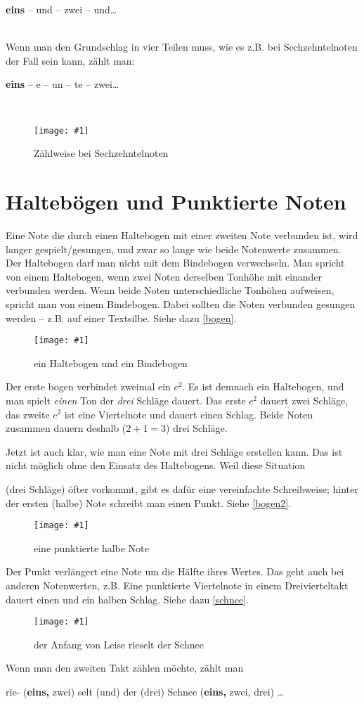 \documentclass[10pt,a4paper,twoside]{report}
\newcommand{\comment}[1]{
	\marginpar{
		\textsf{#1}
	}
}
\newcommand{\image}[4]{
	\begin{figure}[!ht]
		\centering
		\texttt{[image: \#1]}
		\caption{#2}
		\label{#3}
	\end{figure}
}
\newcommand{\myquote}[1]{
	\hspace{15mm}
	\parbox{100mm}{
		#1
	}
	\ \\
}
\begin{document}
\myquote{\textbf{eins} -- und -- zwei -- und\dots}

Wenn man den Grundschlag in vier Teilen muss, wie es z.B. bei Sechzehntelnoten der
Fall sein kann, zählt man: 

\myquote{\textbf{eins} -- e -- un -- te -- zwei\dots}

\image{lilypond/sechzehn.png}{Zählweise bei Sechzehntelnoten}{sechzehn}{7}

\section{Haltebögen und Punktierte Noten}
Eine Note die durch einen Haltebogen mit einer zweiten Note verbunden ist,
wird langer gespielt/gesungen, und zwar so lange wie beide Notenwerte zusammen.
Der Haltebogen\comment{Haltebogen} darf man nicht mit dem Bindebogen verwechseln.
Man spricht von einem Haltebogen, wenn zwei Noten derselben Tonhöhe mit einander
verbunden werden. Wenn beide Noten unterschiedliche Tonhöhen aufweisen, spricht man
von einem Bindebogen. Dabei sollten die Noten verbunden gesungen werden -- 
z.B. auf einer Textsilbe. Siehe dazu \autoref{bogen}.
\image{lilypond/bogen.png}{ein Haltebogen und ein Bindebogen}{bogen}{6}

Der erste bogen verbindet zweimal ein $c^2$. Es ist demnach ein Haltebogen, und man
spielt \emph{einen} Ton der \emph{drei} Schläge dauert. Das erste $c^2$ dauert zwei 
Schläge, das zweite $c^2$ ist eine Viertelnote und dauert einen Schlag. Beide Noten
zusammen dauern deshalb ($2 + 1 = 3$) drei Schläge.

Jetzt ist auch klar, wie man eine Note mit drei Schläge erstellen kann. Das ist 
nicht möglich ohne den Einsatz des Haltebogens. Weil diese Situation
\comment{Punkt verlängert um die Hälfte} (drei Schläge)
öfter vorkommt, gibt es dafür eine vereinfachte Schreibweise; hinter der ersten (halbe)
Note schreibt man einen Punkt. Siehe \autoref{bogen2}.
\image{lilypond/bogen2.png}{eine punktierte halbe Note}{bogen2}{6}

Der Punkt verlängert eine Note um die Hälfte ihres Wertes. Das geht auch bei anderen 
Notenwerten, z.B. Eine punktierte Viertelnote in einem Dreivierteltakt dauert einen und 
ein halben Schlag. Siehe dazu \autoref{schnee}.
\image{lilypond/schnee.png}{der Anfang von \glqq Leise rieselt der Schnee\grqq }{schnee}{7}

Wenn man den zweiten Takt zählen möchte, zählt man

\myquote{
	rie- {\footnotesize (\textbf{eins,} zwei)} selt {\footnotesize (und)} der 
	{\footnotesize (drei)} Schnee {\footnotesize (\textbf{eins,} zwei, drei)}
	\dots
}
\end{document}
